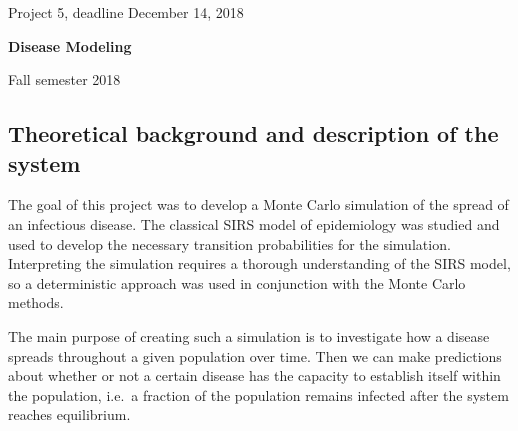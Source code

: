 \documentclass[%
oneside,                 %
final,                   %
10pt]{article}
\begin{document}

\newcommand{\exercisesection}[1]{\subsection*{#1}}






\thispagestyle{empty}

\begin{center}
{\LARGE\bf
\begin{spacing}{1.25}
Project 5, deadline  December 14, 2018
\end{spacing}
}
\end{center}


\begin{center}
{\bf Disease Modeling${}^{}$} \\ [0mm]
\end{center}

\begin{center}
\end{center}
    

\begin{center}
Fall semester 2018
\end{center}

\vspace{1cm}


\subsection{Theoretical background and description of the system}

The goal of this project was to develop a Monte Carlo simulation of
the spread of an infectious disease. The classical SIRS model of
epidemiology was studied and used to develop the necessary transition
probabilities for the simulation. Interpreting the simulation requires
a thorough understanding of the SIRS model, so a deterministic
approach was used in conjunction with the Monte Carlo methods. 

The main purpose of creating such a simulation is to investigate how a
disease spreads throughout a given population over time. Then we can
make predictions about whether or not a certain disease has the
capacity to establish itself within the population, i.e.~a fraction of
the population remains infected after the system reaches
equilibrium. 
\end{document}
